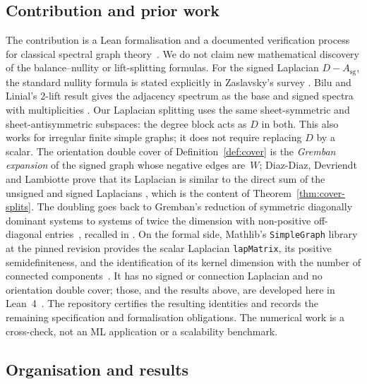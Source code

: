 \documentclass[11pt,a4paper]{amsart}
\theoremstyle{plain}
\theoremstyle{definition}
\theoremstyle{remark}
\begin{document}
\subsection*{Contribution and prior work}

The contribution is a Lean formalisation and a documented verification
process for classical spectral graph theory~\cite{Chung}. We do not claim new
mathematical discovery of the balance--nullity or lift-splitting formulas.
For the signed Laplacian $D-A_{\mathrm{sg}}$, the standard nullity
formula is stated explicitly in Zaslavsky's survey
\cite[Lemma~IV.2]{ZaslavskyMatrices}.
Bilu and Linial's $2$-lift result gives the adjacency spectrum as the
base and signed spectra with multiplicities
\cite[preprint Lemma~3.1]{BiluLinial}. Our Laplacian splitting uses
the same sheet-symmetric and sheet-antisymmetric subspaces: the
degree block acts as $D$ in both. This also works for irregular
finite simple graphs; it does not require replacing $D$ by a scalar.
The orientation double cover of Definition~\ref{def:cover} is the
\emph{Gremban expansion} of the signed graph whose negative edges
are~$W$; Diaz-Diaz, Devriendt and Lambiotte prove that its Laplacian is
similar to the direct sum of the unsigned and signed Laplacians
\cite[Def.~2.1, Cor.~3.8]{DiazDevriendtLambiotte}, which is the content
of Theorem~\ref{thm:cover-splits}. The doubling goes back to Gremban's
reduction of symmetric diagonally dominant systems to systems of twice
the dimension with non-positive off-diagonal entries~\cite{Gremban},
recalled in \cite[\S2.2]{SpielmanTeng}.
On the formal side, Mathlib's \texttt{SimpleGraph} library at the pinned
revision provides the scalar Laplacian \texttt{lapMatrix}, its positive
semidefiniteness, and the identification of its kernel dimension with
the number of connected components~\cite{Mathlib}. It has no signed or
connection Laplacian and no orientation double cover; those, and the
results above, are developed here in Lean~4~\cite{Lean4}.
The repository certifies the resulting identities and records the
remaining specification and formalisation obligations.
The numerical work is a cross-check, not an ML application or a
scalability benchmark.

\subsection*{Organisation and results}
\end{document}
